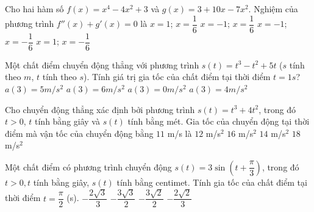 \begin{ex}%
	Cho hai hàm số $f(x)=x^4-4x^2+3$ và $g(x)=3+10x-7x^2$. Nghiệm của phương trình $f''(x)+g'(x)=0$ là
	\choice
	{\True $x=1$; $x=\dfrac{1}{6}$}
	{$x=-1$; $x=\dfrac{1}{6}$}
	{$x=-1$; $x=-\dfrac{1}{6}$}
	{$x=1$; $x=-\dfrac{1}{6}$}
\end{ex}


\begin{ex}%
	Một chất điểm chuyển động thẳng với phương trình $s(t)=t^3-t^2+5t$ ($s$ tính theo $m$, $t$ tính theo $s$). Tính giá trị gia tốc của chất điểm tại thời điểm $t=1s$?
	\choice
	{$a(3)=5m/s^2$}
	{$a(3)=6m/s^2$}
	{$a(3)=0m/s^2$}
	{\True $a(3)=4m/s^2$}
\end{ex}

\begin{ex}%
	Cho chuyển động thẳng xác định bởi phương trình $s(t)=t^3+4t^2$, trong đó $t>0$, $t$ tính bằng giây và $s(t)$ tính bằng mét. Gia tốc của chuyển động tại thời điểm mà vận tốc của chuyển động bằng $11$ m/s là
	\choice
	{$12$ m/s$^2$}
	{$16$ m/s$^2$}
	{\True $14$ m/s$^2$}
	{$18$ m/s$^2$}
\end{ex}

\begin{ex}%
	Một chất điểm có phương trình chuyển động $s(t)=3 \sin\left(t + \dfrac{\pi}{3} \right) $, trong đó $t>0, t$ tính bằng giây, $s(t)$ tính bằng centimet. Tính gia tốc của chất điểm tại thời điểm $t= \dfrac{\pi}{2}$ (s).
	\choice
	{$-\dfrac{2\sqrt{3}}{3}$}
	{\True $-\dfrac{3\sqrt{3}}{2}$}
	{$-\dfrac{3\sqrt{2}}{2}$}
	{$-\dfrac{2\sqrt{2}}{3}$}
\end{ex}

